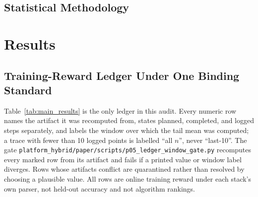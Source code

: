\documentclass{article}
\begin{document}
\subsection{Statistical Methodology}
\label{sec:statistical-policy}


\section{Results}
\label{sec:results}



\subsection{Training-Reward Ledger Under One Binding Standard}
\label{sec:main_results}

Table~\ref{tab:main_results} is the only ledger in this audit. Every numeric
row names the artifact it was recomputed from, states planned, completed, and
logged steps separately, and labels the window over which the tail mean was
computed; a trace with fewer than 10 logged points is labelled ``all $n$'',
never ``last-10''. The gate
\texttt{platform\_hybrid/paper/scripts/p05\_ledger\_window\_gate.py} recomputes
every marked row from its artifact and fails if a printed value or window label
diverges. Rows whose artifacts conflict are quarantined rather than resolved by
choosing a plausible value. All rows are online training reward under each
stack's own parser, not held-out accuracy and not algorithm rankings.
\end{document}

